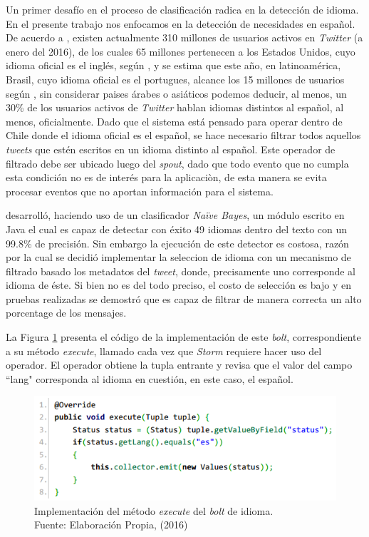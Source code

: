 Un primer desafío en el proceso de clasificación radica en la detección de idioma. En el presente trabajo nos enfocamos en la detección de necesidades en español. De acuerdo a \cite{TwitterActiveUsers}, existen actualmente 310 millones de usuarios activos en \textit{Twitter} (a enero del 2016), de los cuales 65 millones pertenecen a los Estados Unidos, cuyo idioma oficial es el inglés, según \cite{TwitterStats1}, y se estima que este año, en latinoamérica, Brasil, cuyo idioma oficial es el portugues, alcance los 15 millones de usuarios según \cite{TwitterStats2}, sin considerar paises árabes o asiáticos podemos deducir, al menos, un 30\% de los usuarios activos de \textit{Twitter} hablan idiomas distintos al español, al menos, oficialmente. Dado que el sistema está pensado para operar dentro de Chile donde el idioma oficial es el español, se hace necesario filtrar todos aquellos \textit{tweets} que estén escritos en un idioma distinto al español. Este operador de filtrado debe ser ubicado luego del \textit{spout}, dado que todo evento que no cumpla esta condición no es de interés para la aplicaciòn, de esta manera se evita procesar eventos que no aportan información para el sistema.

\cite{languageDetector} desarrolló, haciendo uso de un clasificador \textit{Naïve Bayes}, un módulo escrito en Java el cual es capaz de detectar con éxito 49 idiomas dentro del texto con un 99.8\% de precisión. Sin embargo la ejecución de este detector es costosa, razón por la cual se decidió implementar la seleccion de idioma con un mecanismo de filtrado basado los metadatos del \textit{tweet}, donde, precisamente uno corresponde al idioma de éste. Si bien no es del todo preciso, el costo de selección es bajo y en pruebas realizadas se demostró que es capaz de filtrar de manera correcta un alto porcentage de los mensajes.

La Figura \ref{fig:operadorIdioma} presenta el código de la implementación de este \textit{bolt}, correspondiente a su método \textit{execute}, llamado cada vez que \textit{Storm} requiere hacer uso del operador. El operador obtiene la tupla entrante y revisa que el valor del campo ``lang" corresponda al idioma en cuestión, en este caso, el español.

\begin{figure}[H]
	\centering
	\captionsetup{justification=centering}
	\includegraphics[scale=0.8]{images/LanguageBoltExecute.png}
	\caption[Implementación del método \textit{execute} del \textit{bolt} de idioma.]{Implementación del método \textit{execute} del \textit{bolt} de idioma.\\Fuente: Elaboración Propia, (2016)}
	\label{fig:operadorIdioma}
\end{figure}

